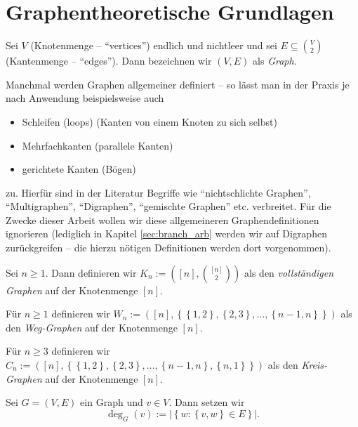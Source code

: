 \documentclass[10p,a4paper,BCOR = 12mm, DIV=15]{scrbook}
\begin{document}
\section{Graphentheoretische Grundlagen}

\begin{Def}
Sei $V$ (Knotenmenge -- "`vertices"') endlich und nichtleer und sei $E \subseteq {V \choose 2}$ (Kantenmenge -- "`edges"'). Dann bezeichnen wir $\left(V, E\right)$ als \emph{Graph}.
\end{Def}

\begin{Bem}
Manchmal werden Graphen allgemeiner definiert -- so lässt man in der Praxis je nach Anwendung beispielsweise auch
\begin{itemize}
\item Schleifen (loops) (Kanten von einem Knoten zu sich selbst)
\item Mehrfachkanten (parallele Kanten)
\item gerichtete Kanten (Bögen)
\end{itemize}
zu. Hierfür sind in der Literatur Begriffe wie "`nichtschlichte Graphen"', "`Multigraphen"', "`Digraphen"', "`gemischte Graphen"' etc. verbreitet. Für die Zwecke dieser Arbeit wollen wir diese allgemeineren Graphendefinitionen ignorieren (lediglich in Kapitel \ref{sec:branch_arb} werden wir auf Digraphen zurückgreifen -- die hierzu nötigen Definitionen werden dort vorgenommen).
\end{Bem}

\begin{BspDef}
Sei $n \geq 1$. Dann definieren wir $K_n := \left(\left[n\right], {\left[n\right] \choose 2}\right)$ als den \emph{vollständigen Graphen} auf der Knotenmenge $\left[n\right]$.

Für $n \geq 1$ definieren wir $W_n := \left(\left[n\right], \left\{\left\{1, 2\right\}, \left\{2, 3\right\}, \ldots, \left\{n-1, n\right\}\right\}\right)$ als den \emph{Weg-Graphen} auf der Knotenmenge $\left[n\right]$.

Für $n \geq 3$ definieren wir $C_n := \left(\left[n\right], \left\{\left\{1, 2\right\}, \left\{2, 3\right\}, \ldots, \left\{n-1, n\right\}, \left\{n, 1\right\}\right\}\right)$ als den \emph{Kreis-Graphen} auf der Knotenmenge $\left[n\right]$.
\end{BspDef}

\begin{Def}
Sei $G=(V, E)$ ein Graph und $v\in V$. Dann setzen wir 
\begin{displaymath}
\deg_G\left(v\right) := \left|\left\{w: \left\{v, w\right\} \in E\right\}\right|.
\end{displaymath}
\end{Def}
\end{document}
